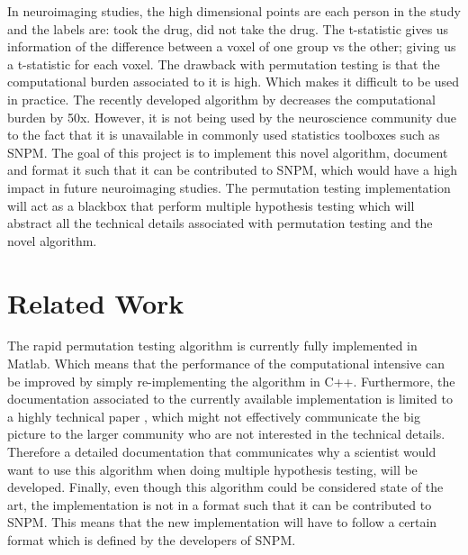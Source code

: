 \documentclass[10pt,letterpaper]{article}
\begin{document}
\newline
\newline
In neuroimaging studies, the high dimensional points are each person in the study and the labels are: took the drug, did not take the drug. The t-statistic gives us information of the difference between a voxel of one group vs the other; giving us a t-statistic for each voxel. 
\newline
\newline
The drawback with permutation testing is that the computational burden associated to it is high. Which makes it difficult to be used in practice. The recently developed algorithm by \cite{vamsi} decreases the computational burden by 50x. However, it is not being used by the neuroscience community due to the fact that it is unavailable in commonly used statistics toolboxes such as SNPM. The goal of this project is to implement this novel algorithm, document and format it such that it can be contributed to SNPM, which would have a high impact in future neuroimaging studies. The permutation testing implementation will act as a blackbox that perform multiple hypothesis testing which will abstract all the technical details associated with permutation testing and the novel algorithm.

\section{Related Work}
The rapid permutation testing algorithm \cite{vamsi} is currently fully implemented in Matlab. Which means that the performance of the computational intensive can be improved by simply re-implementing the algorithm in C++. Furthermore, the documentation associated to the currently available implementation is limited to a highly technical paper \cite{vamsi}, which might not effectively communicate the big picture to the larger community who are not interested in the technical details. Therefore a detailed documentation that communicates why a scientist would want to use this algorithm when doing multiple hypothesis testing, will be developed. Finally, even though this algorithm could be considered state of the art, the implementation is not in a format such that it can be contributed to SNPM. This means that the new implementation will have to follow a certain format which is defined by the developers of SNPM.
 
\end{document}
